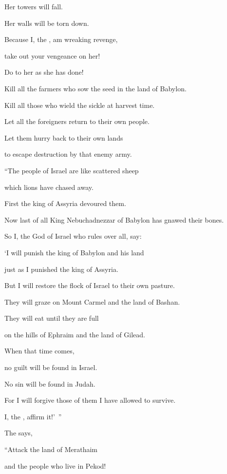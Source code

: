 {\par }{\Q Her towers
will fall.
\par }{\Q Her walls
will be torn down.
\par }{\Q Because
I, the
{}, am wreaking revenge,
\par }{\Q take out your vengeance
on her!
\par }{\Q Do
to her as
she
has done!
\par }{\Q {}Kill
all the farmers who sow
the seed in the land
of Babylon.
\par }{\Q Kill all those who wield
the sickle
at harvest
time.
\par }{\Q Let all the foreigners return to
their own
people.
\par }{\Q Let them hurry back
to
their own
lands
\par }{\Q to
escape
destruction by
that enemy army.
\par }{\Q {}“The people of Israel
are like scattered
sheep
\par }{\Q which lions
have chased away.
\par }{\Q First
the king
of Assyria
devoured
them.

\par }{\Q Now
last
of all King
Nebuchadnezzar
of Babylon
has gnawed their bones.
\par }{\Q {}So
I,
the {}
God
of Israel
who rules over all,
say:

\par }{\Q ‘I
will punish
the king
of Babylon
and his land
\par }{\Q just
as I punished
the king
of Assyria.
\par }{\Q {}But
I will restore
the flock of Israel
to
their own pasture.
\par }{\Q They will graze
on Mount Carmel
and the land of Bashan.
\par }{\Q They will eat until they are full
\par }{\Q on the hills
of Ephraim
and the land of Gilead.
\par }{\Q {}When
that time
comes,
\par }{\Q no
guilt
will be found
in Israel.
\par }{\Q No
sin
will be found
in Judah.
\par }{\Q For
I will forgive
those
of them I have allowed to survive.
\par }{\Q I, the
{}, affirm it!’ ”
\par }{\Q {}The
{}
says,
\par }{\Q “Attack
the land
of Merathaim
\par }{\Q and the people who live
in Pekod!

}
